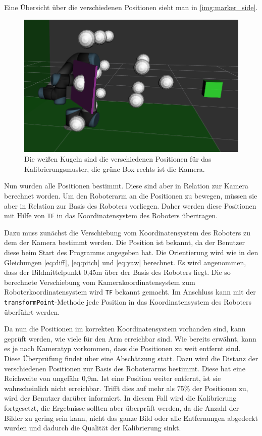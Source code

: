 Eine Übersicht über die verschiedenen Positionen sieht man in \autoref{img:marker_side}.
\begin{figure}
\centering
\includegraphics[width=\textwidth]{images/marker_side.png}
\caption{Die weißen Kugeln sind die verschiedenen Positionen für das Kalibrierungsmuster, die grüne Box rechts ist die Kamera.}\label{img:marker_side}
\end{figure}


Nun wurden alle Positionen bestimmt. Diese sind aber in Relation zur Kamera berechnet worden. Um den Roboterarm an die Positionen zu bewegen, müssen sie aber in Relation zur Basis des Roboters vorliegen. Daher werden diese Positionen mit Hilfe von \texttt{TF} in das Koordinatensystem des Roboters übertragen.

Dazu muss zunächst die Verschiebung vom Koordinatensystem des Roboters zu dem der Kamera bestimmt werden. Die Position ist bekannt, da der Benutzer diese beim Start des Programms angegeben hat. Die Orientierung wird wie in den Gleichungen \autoref{eq:diff}, \autoref{eq:pitch} und \autoref{eq:yaw} berechnet. Es wird angenommen, dass der Bildmittelpunkt 0,45m über der Basis des Roboters liegt. Die so berechnete Verschiebung vom Kamerakoordinatensystem zum Roboterkoordinatensystem wird \texttt{TF} bekannt gemacht. Im Anschluss kann mit der \texttt{transformPoint}-Methode jede Position in das Koordinatensystem des Roboters überführt werden.

Da nun die Positionen im korrekten Koordinatensystem vorhanden sind, kann geprüft werden, wie viele für den Arm erreichbar sind. Wie bereits erwähnt, kann es je nach Kameratyp vorkommen, dass die Positionen zu weit entfernt sind. Diese Überprüfung findet über eine Abschätzung statt. Dazu wird die Distanz der verschiedenen Positionen zur Basis des Roboterarms bestimmt. Diese hat eine Reichweite von ungefähr 0,9m. Ist eine Position weiter entfernt, ist sie wahrscheinlich nicht erreichbar. Trifft dies auf mehr als 75\% der Positionen zu, wird der Benutzer darüber informiert. In diesem Fall wird die Kalibrierung fortgesetzt, die Ergebnisse sollten aber überprüft werden, da die Anzahl der Bilder zu gering sein kann, nicht das ganze Bild oder alle Entfernungen abgedeckt wurden und dadurch die Qualität der Kalibrierung sinkt.

